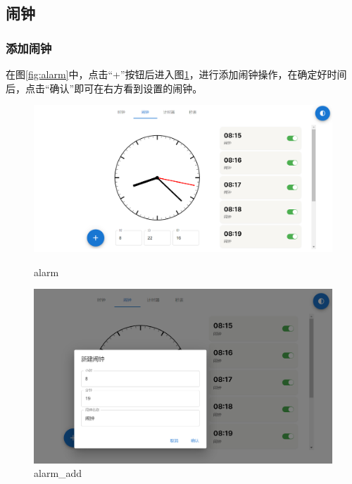 \documentclass[a4paper,11pt]{article}
\begin{document}
\subsection{闹钟}

\subsubsection{添加闹钟}
在图\ref{fig:alarm}中，点击“+”按钮后进入图\ref{fig:alarm_add}，进行添加闹钟操作，在确定好时间后，点击“确认”即可在右方看到设置的闹钟。
\begin{figure}[!h]
    \centering
    \begin{minipage}{0.48\textwidth}
        \centering
        \includegraphics[width=\linewidth]{image/alarm.png}
        \caption{alarm}
            \label{fig:alarm}
    \end{minipage}\hfill
    \begin{minipage}{0.48\textwidth}
        \centering
        \includegraphics[width=\linewidth]{image/alarm_add.png}
        \caption{alarm\_add}
        \label{fig:alarm_add}
    \end{minipage}
\end{figure}
\end{document}
